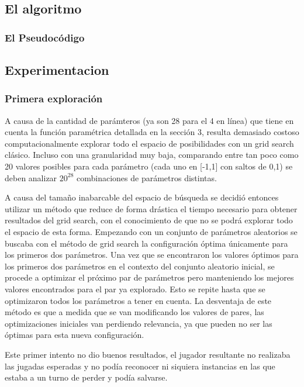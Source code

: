 \documentclass[A4paper,oneside,fleqn,11pt]{article}
\theoremstyle{definition}
\begin{document}
\subsection{El algoritmo}

\subsubsection{El Pseudocódigo}





\subsection{Experimentacion}

\subsubsection{Primera exploración}

A causa de la cantidad de parámteros (ya son 28 para el 4 en línea) que tiene en cuenta la función paramétrica detallada en la sección 3, resulta demasiado costoso computacionalmente explorar todo el espacio de posibilidades con un grid search clásico. Incluso  con una granularidad muy baja, comparando entre tan poco como 20 valores posibles para cada parámetro (cada uno en [-1,1] con saltos de 0,1) se deben analizar $ 20^{28}$ combinaciones de parámetros distintas.

A causa del tamaño inabarcable del espacio de búsqueda se decidió entonces utilizar un método que reduce de forma drástica el tiempo necesario para obtener resultados del grid search, con el conocimiento de que no se podrá explorar todo el espacio de esta forma. Empezando con un conjunto de parámetros aleatorios se buscaba con el método de grid search la configuración óptima únicamente para los primeros dos parámetros. Una vez que se encontraron los valores óptimos para los primeros dos parámetros en el contexto del conjunto aleatorio inicial, se procede a optimizar el próximo par de parámetros pero manteniendo los mejores valores encontrados para el par ya explorado. Esto se repite hasta que se optimizaron todos los parámetros a tener en cuenta. La desventaja de este método es que a medida que se van modificando los valores de pares, las optimizaciones iniciales van perdiendo relevancia, ya que pueden no ser las óptimas para esta nueva configuración.

Este primer intento no dio buenos resultados, el jugador resultante no realizaba las jugadas esperadas y no podía reconocer ni siquiera instancias en las que estaba a un turno de perder y podía salvarse.
\end{document}
